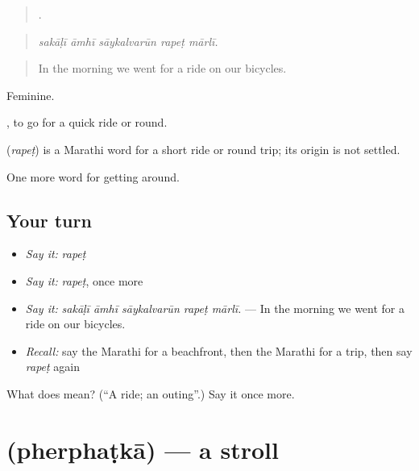 \begin{quote}
    .
\end{quote}

\begin{quote}
\emph{sakāḷī āmhī sāykalvarūn rapeṭ mārlī.}
\end{quote}

\begin{quote}
In the morning we went for a ride on our bicycles.
\end{quote}

Feminine.

 , to go for a quick ride or round.

\begin{cousinweb}
\textbf{} (\emph{rapeṭ}) is a Marathi word for a short ride or round trip; its origin is not settled.
\end{cousinweb}

\begin{grammarlens}[title={What you've built}]
One more word for getting around.
\end{grammarlens}

\subsection*{Your turn}
\begin{itemize}
\raggedright
  \item \emph{Say it:} \emph{rapeṭ}
  \item \emph{Say it:} \emph{rapeṭ}, once more
  \item \emph{Say it:} \emph{sakāḷī āmhī sāykalvarūn rapeṭ mārlī.} — In the morning we went for a ride on our bicycles.
  \item \emph{Recall:} say the Marathi for a beachfront, then the Marathi for a trip, then say \emph{rapeṭ} again
\end{itemize}

\begin{tcolorbox}[breakable,colback=teal!4,colframe=teal!35!black,title={Before you move on}]
What does  mean? (\textquotedblleft{}A ride; an outing\textquotedblright{}.) Say it once more.
\end{tcolorbox}
\section[\texorpdfstring{\mr{फेरफटका} (pherphaṭkā)}{फेरफटका (pherphaṭkā)}]{ (pherphaṭkā) — a stroll}

